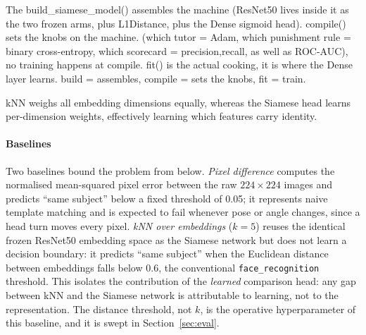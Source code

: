 \documentclass[conference]{IEEEtran}
\begin{document}
The build\_siamese\_model() assembles the machine (ResNet50 lives inside it as the two frozen arms, plus L1Distance, plus the Dense sigmoid head). compile() sets the knobs on the machine. (which tutor = Adam, which punishment rule = binary cross-entropy, which scorecard = precision,recall, as well as ROC-AUC), no training happens at compile. fit() is the actual cooking, it is where the Dense layer learns. build = assembles, compile = sets the knobs, fit = train.

kNN weighs all embedding dimensions equally, whereas the Siamese head learns per-dimension weights, effectively learning which features carry identity.

\paragraph{Baselines}
Two baselines bound the problem from below. \emph{Pixel difference} computes
the normalised mean-squared pixel error between the raw $224 \times 224$
images and predicts ``same subject'' below a fixed threshold of 0.05; it
represents naive template matching and is expected to fail whenever pose or
angle changes, since a head turn moves every pixel. \emph{kNN over
embeddings} ($k=5$) reuses the identical frozen ResNet50 embedding space as
the Siamese network but does not learn a decision boundary: it predicts
``same subject'' when the Euclidean distance between embeddings falls below
0.6, the conventional \texttt{face\_recognition} threshold. This isolates the
contribution of the \emph{learned} comparison head: any gap between kNN and
the Siamese network is attributable to learning, not to the representation.
The distance threshold, not $k$, is the operative hyperparameter of this
baseline, and it is swept in Section~\ref{sec:eval}.
\end{document}
